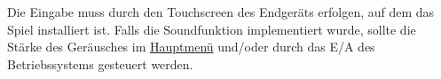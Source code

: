 Die Eingabe \gls{muss} durch den Touchscreen des Endgeräts erfolgen, auf dem das Spiel installiert ist.
Falls die Soundfunktion implementiert wurde, \gls{sollte} die Stärke des Geräusches im \hyperref[fig:dia:mainMenu]{Hauptmenü} und/oder durch das E/A des Betriebssystems gesteuert werden.